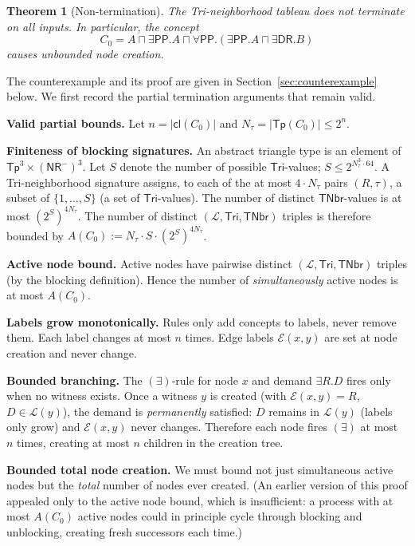 \documentclass[a4paper,11pt]{article}
\newtheorem{theorem}{Theorem}[section]
\theoremstyle{definition}
\newcommand{\DR}{\ensuremath{\mathsf{DR}}}
\newcommand{\PP}{\ensuremath{\mathsf{PP}}}
\newcommand{\cl}{\ensuremath{\mathsf{cl}}}
\newcommand{\Tp}{\ensuremath{\mathsf{Tp}}}
\newcommand{\NR}{\ensuremath{\mathsf{NR}}}
\newcommand{\Tri}{\ensuremath{\mathsf{Tri}}}
\newcommand{\TNbr}{\ensuremath{\mathsf{TNbr}}}
\newcommand{\LL}{\ensuremath{\mathcal{L}}}
\newcommand{\EE}{\ensuremath{\mathcal{E}}}
\begin{document}
\begin{theorem}[Non-termination]\label{thm:nonterm}
The Tri-neighborhood tableau does not terminate on all inputs.
In particular, the concept
\[
C_0 = A \sqcap \exists\PP.A \sqcap
\forall\PP.(\exists\PP.A \sqcap \exists\DR.B)
\]
causes unbounded node creation.
\end{theorem}

The counterexample and its proof are given in
Section~\ref{sec:counterexample} below.  We first record
the partial termination arguments that remain valid.

\medskip\noindent\textbf{Valid partial bounds.}\;
Let $n = |\cl(C_0)|$ and $N_\tau = |\Tp(C_0)| \le 2^n$.

\medskip\noindent\textbf{Finiteness of blocking signatures.}\;
An abstract triangle type is an element of
$\Tp^3 \times (\NR^{-})^3$.  Let $S$ denote the number of
possible $\Tri$-values; $S \le 2^{N_\tau^3 \cdot 64}$.
A Tri-neighborhood signature assigns, to each of the at most
$4 \cdot N_\tau$ pairs $(R, \tau)$, a subset of $\{1, \ldots, S\}$
(a set of $\Tri$-values).  The number of distinct
$\TNbr$-values is at most $(2^S)^{4 N_\tau}$.
The number of distinct $(\LL, \Tri, \TNbr)$ triples is
therefore bounded by
$A(C_0) := N_\tau \cdot S \cdot (2^S)^{4 N_\tau}$.

\medskip\noindent\textbf{Active node bound.}\;
Active nodes have pairwise distinct
$(\LL, \Tri, \TNbr)$ triples (by the blocking
definition).  Hence the number of \emph{simultaneously}
active nodes is at most $A(C_0)$.

\medskip\noindent\textbf{Labels grow monotonically.}\;
Rules only add concepts to labels, never remove them.  Each
label changes at most $n$ times.  Edge labels $\EE(x,y)$ are
set at node creation and never change.

\medskip\noindent\textbf{Bounded branching.}\;
The $(\exists)$-rule for node $x$ and demand
$\exists R.D$ fires only when no witness exists.  Once a
witness $y$ is created (with $\EE(x,y)=R$, $D \in \LL(y)$),
the demand is \emph{permanently} satisfied: $D$ remains in
$\LL(y)$ (labels only grow) and $\EE(x,y)$ never changes.
Therefore each node fires $(\exists)$ at most $n$ times,
creating at most $n$ children in the creation tree.

\medskip\noindent\textbf{Bounded total node creation.}\;
We must bound not just simultaneous active nodes but the
\emph{total} number of nodes ever created.  (An earlier version
of this proof appealed only to the active node bound, which
is insufficient: a process with at most $A(C_0)$ active nodes
could in principle cycle through blocking and unblocking,
creating fresh successors each time.)
\end{document}
